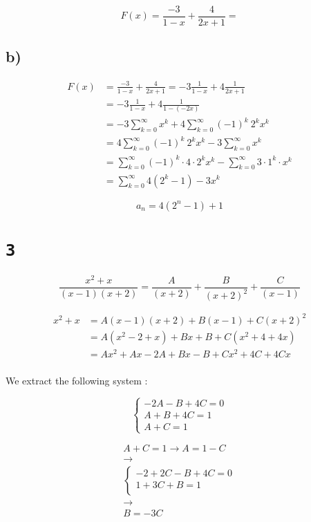 \documentclass[a4paper,11pt]{report}
\begin{document}
\[
  F(x) = \frac{-3}{1-x} + \frac{4}{2x+1} =
\]

\subsection*{b)}

\begin{align*}
  F(x) &= \frac{-3}{1-x} + \frac{4}{2x+1} = -3 \frac{1}{1-x} + 4 \frac{1}{2x+1} \\
       &= -3 \frac{1}{1-x} + 4 \frac{1}{1-(-2x)} \\
       &= -3 \sum_{k=0}^{\infty} x^k + 4 \sum_{k=0}^{\infty} (-1)^k\ 2^kx^k \\
       &= 4 \sum_{k=0}^{\infty} (-1)^k\ 2^kx^k - 3 \sum_{k=0}^{\infty} x^k \\
       &= \sum_{k=0}^{\infty} (-1)^k \cdot 4 \cdot 2^kx^k - \sum_{k=0}^{\infty} 3 \cdot 1^k \cdot x^k \\
       &= \sum_{k=0}^{\infty} 4(2^k-1) - 3 x^k
\end{align*}

\[
  a_n = 4(2^n - 1) + 1
\]

\section*{\texttt{3}}

\[
  \frac{x^2 + x}{(x-1)(x+2)} = \frac{A}{(x+2)} + \frac{B}{(x+2)^2} + \frac{C}{(x-1)}
\]

\begin{align*}
  x^2 + x &= A(x-1)(x+2) + B(x-1) + C(x+2)^2 \\
          &= A(x^2 -2 + x) + Bx + B + C(x^2 + 4 + 4x)\\
          &= Ax^2 + Ax - 2A + Bx -B+Cx^2 + 4C+ 4Cx\\
\end{align*}

We extract the following system :

\[
  \begin{cases}
    -2A - B + 4C = 0 \\
    A + B + 4C = 1 \\
    A + C = 1
  \end{cases}
\]

\begin{gather*}
  A + C = 1 \longrightarrow A = 1 - C \\
  \longrightarrow \\
  \begin{cases}
    -2 + 2C - B + 4C = 0 \\
    1 + 3C + B = 1 \\
  \end{cases}\\
  \longrightarrow \\
  B = -3C \\
\end{gather*}
\end{document}
